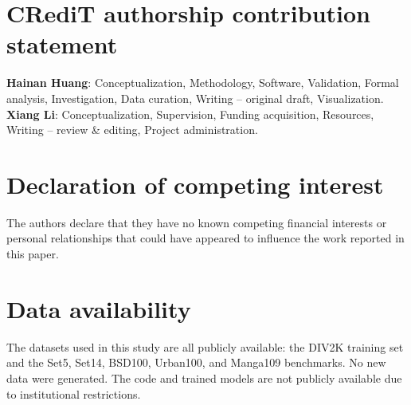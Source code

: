 \documentclass[preprint,12pt]{elsarticle}
\begin{document}


















\section*{CRediT authorship contribution statement}
\textbf{Hainan Huang}: Conceptualization, Methodology, Software, Validation, Formal
analysis, Investigation, Data curation, Writing -- original draft, Visualization.
\textbf{Xiang Li}: Conceptualization, Supervision, Funding acquisition, Resources,
Writing -- review \& editing, Project administration.

\section*{Declaration of competing interest}
The authors declare that they have no known competing financial interests or personal
relationships that could have appeared to influence the work reported in this paper.

\section*{Data availability}
The datasets used in this study are all publicly available: the DIV2K training set and
the Set5, Set14, BSD100, Urban100, and Manga109 benchmarks. No new data were generated.
The code and trained models are not publicly available due to institutional restrictions.



\end{document}
